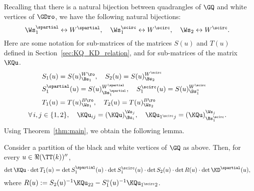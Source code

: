 \documentclass[a4paper,twoside,11pt]{article}
\begin{document}
Recalling that there is a natural bijection between quadrangles of $\GQ$ 
and white vertices of $\GDro$, we have the following natural bijections: 
\begin{equation*}
\Ws_1^\spartial \leftrightarrow W^\spartial, \quad \Ws_1^\scirc \leftrightarrow W^\scirc,\quad 
\Ws_2 \leftrightarrow W^\scirc.
\end{equation*}
Here are some notation for sub-matrices of the matrices $S(u)$ and $T(u)$ defined in Section~\ref{sec:KQ_KD_relation}, and for sub-matrices
of the matrix $\KQu$.
\begin{align*}
&S_1(u)=S(u)_{\Bs_1}^{{W\ro}},\quad S_2(u)=S(u)_{\Bs_2}^{W^\scirc}\\
&S_1^\spartial (u)=S(u)_{\Bs_1^\spartial}^{{W^\spartial}},\quad S_1^\scirc (u)=S(u)_{\Bs_1^\circ}^{{W^\scirc}}\\
&T_1(u)=T(u)_{\Ws_1}^{B\ro},\quad T_2(u)=T(u)_{\Ws_2}^{B\ro}\\
\forall\,i,j&\in\{1,2\},\quad \KQu_{ij}=(\KQu)_{\Bs_i}^{\Ws_j},\quad \KQu_{1^\scirc j}=(\KQu)_{\Bs_1^\scirc}^{\Ws_j}.
\end{align*}
Using Theorem~\ref{thm:main}, we obtain the following lemma.
\begin{lem}\label{lem:KQ_KD_det}
Consider a partition of the black and white vertices of $\GQ$ as above. Then, for every $u\in\Re(\TT(k))''$,
\begin{equation*}
\det\KQu\cdot \det T_1(u)=\det S_1^\spartial(u)\cdot\det S_1^\scirc(u)\cdot\det S_2(u)\cdot\det R(u)\cdot \det \KD^\spartial(u),
\end{equation*}
where $R(u):=S_2(u)^{-1}\KQu_{22}-S_1^\circ(u)^{-1}\KQu_{1^\scirc 2}$.
\end{lem}
\end{document}
